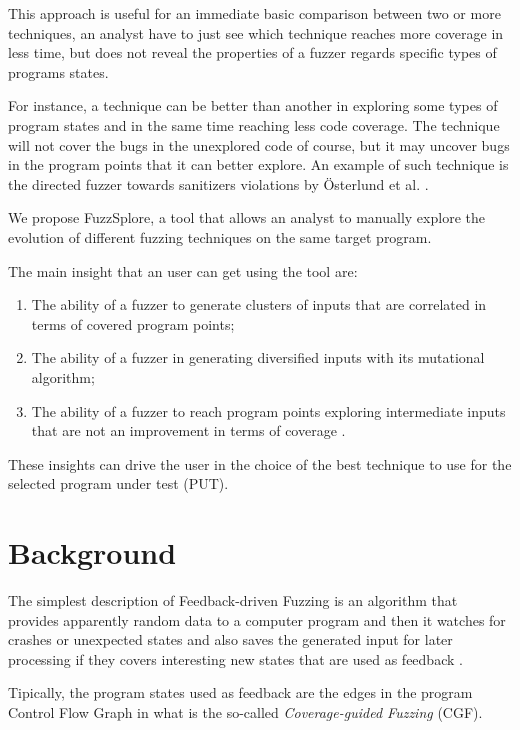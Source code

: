 \documentclass[conference,compsoc]{IEEEtran}
\begin{document}
This approach is useful for an immediate basic comparison between two or more techniques, an analyst have to just see which technique reaches more coverage in less time, but does not reveal the properties of a fuzzer regards specific types of programs states.

For instance, a technique can be better than another in exploring some types of program states and in the same time reaching less code coverage.
The technique will not cover the bugs in the unexplored code of course, but it may uncover bugs in the program points that it can better explore.
An example of such technique is the directed fuzzer towards sanitizers violations by \"Osterlund et al. \cite{parmesan}.

We propose {\sc FuzzSplore}, a tool that allows an analyst to manually explore the evolution of different fuzzing techniques on the same target program.

The main insight that an user can get using the tool are:

\begin{enumerate}
\item The ability of a fuzzer to generate clusters of inputs that are correlated in terms of covered program points;
\item The ability of a fuzzer in generating diversified inputs with its mutational algorithm;
\item The ability of a fuzzer to reach program points exploring intermediate inputs that are not an improvement in terms of coverage \cite{besensitive}.
\end{enumerate}

These insights can drive the user in the choice of the best technique to use for the selected program under test (PUT).

\section{Background}

The simplest description of Feedback-driven Fuzzing is an algorithm that provides apparently random data to a computer program and then it watches for crashes or unexpected states and also saves the generated input for later processing if they covers interesting new states that are used as feedback \cite{fuzzing-book}.

Tipically, the program states used as feedback are the edges in the program Control Flow Graph \cite{compilerbook} in what is the so-called {\it Coverage-guided Fuzzing} (CGF).
\end{document}
